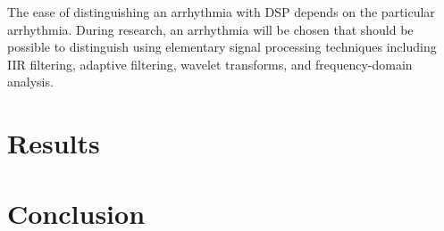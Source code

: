 \documentclass[12pt,letter]{article}
\begin{document}
The ease of distinguishing an arrhythmia with DSP depends on the particular
arrhythmia.  During research, an arrhythmia will be chosen that should be
possible to distinguish using elementary signal processing techniques including
IIR filtering, adaptive filtering, wavelet transforms, and frequency-domain
analysis.  

\section{Results}

\section{Conclusion}

\begin{thebibliography}{99}

\end{thebibliography}
\end{document}
